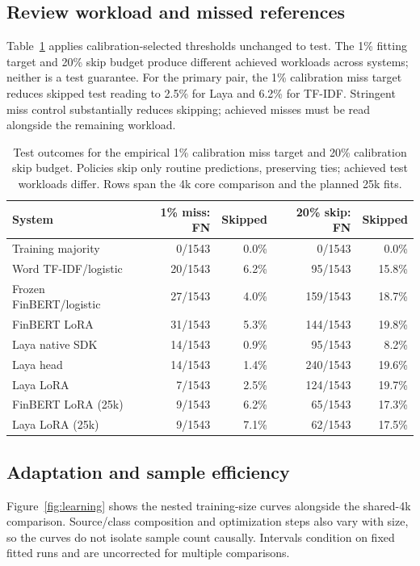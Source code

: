 \subsection{Review workload and missed references}

Table~\ref{tab:policy} applies calibration-selected thresholds unchanged to test. The 1\% fitting target and 20\% skip budget produce different achieved workloads across systems; neither is a test guarantee. For the primary pair, the 1\% calibration miss target reduces skipped test reading to 2.5\% for Laya and 6.2\% for TF-IDF. Stringent miss control substantially reduces skipping; achieved misses must be read alongside the remaining workload.

\begin{table}[!htbp]
\centering
\caption{Test outcomes for the empirical 1\% calibration miss target and 20\% calibration skip budget. Policies skip only routine predictions, preserving ties; achieved test workloads differ. Rows span the 4k core comparison and the planned 25k fits.}
\label{tab:policy}
\small
\setlength{\tabcolsep}{3.5pt}
\begin{tabularx}{\linewidth}{@{}Xrrrr@{}}
\toprule
System & 1\% miss: FN & Skipped & 20\% skip: FN & Skipped\\
\midrule
Training majority & 0/1543 & 0.0\% & 0/1543 & 0.0\%\\
Word TF-IDF/logistic & 20/1543 & 6.2\% & 95/1543 & 15.8\%\\
Frozen FinBERT/logistic & 27/1543 & 4.0\% & 159/1543 & 18.7\%\\
FinBERT LoRA & 31/1543 & 5.3\% & 144/1543 & 19.8\%\\
Laya native SDK & 14/1543 & 0.9\% & 95/1543 & 8.2\%\\
Laya head & 14/1543 & 1.4\% & 240/1543 & 19.6\%\\
Laya LoRA & 7/1543 & 2.5\% & 124/1543 & 19.7\%\\
FinBERT LoRA (25k) & 9/1543 & 6.2\% & 65/1543 & 17.3\%\\
Laya LoRA (25k) & 9/1543 & 7.1\% & 62/1543 & 17.5\%\\
\bottomrule
\end{tabularx}
\end{table}

\subsection{Adaptation and sample efficiency}

Figure~\ref{fig:learning} shows the nested training-size curves alongside the shared-4k comparison. Source/class composition and optimization steps also vary with size, so the curves do not isolate sample count causally. Intervals condition on fixed fitted runs and are uncorrected for multiple comparisons.

